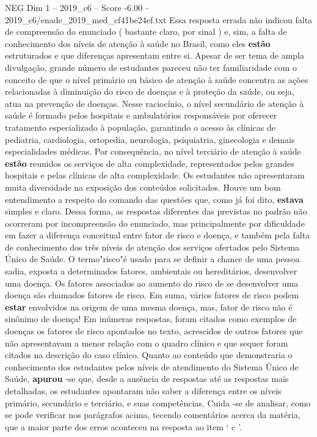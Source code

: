 \begin{textsample}{NEG Dim 1 – 2019\_c6 – Score -6.00 – 2019\_c6/enade\_2019\_med\_cf41be24ef.txt}
Essa resposta errada não indicou falta de compreensão do enunciado ( bastante claro, por sinal ) e, sim, a falta de conhecimento dos níveis de atenção à saúde no Brasil, como eles \textbf{estão} estruturados e que diferenças apresentam entre si.
Apesar de ser tema de ampla divulgação, grande número de estudantes pareceu não ter familiaridade com o conceito de que o nível primário ou básico de atenção à saúde concentra as ações relacionadas à diminuição do risco de doenças e à proteção da saúde, ou seja, atua na prevenção de doenças.
Nesse raciocínio, o nível secundário de atenção à saúde é formado pelos hospitais e ambulatórios responsáveis por oferecer tratamento especializado à população, garantindo o acesso às clínicas de pediatria, cardiologia, ortopedia, neurologia, psiquiatria, ginecologia e demais especialidades médicas.
Por consequência, no nível terciário de atenção à saúde \textbf{estão} reunidos os serviços de alta complexidade, representados pelos grandes hospitais e pelas clínicas de alta complexidade.
Os estudantes não apresentaram muita diversidade na exposição dos conteúdos solicitados.
Houve um bom entendimento a respeito do comando das questões que, como já foi dito, \textbf{estava} simples e claro.
Dessa forma, as respostas diferentes das previstas no padrão não ocorreram por incompreensão do enunciado, mas principalmente por dificuldade em fazer a diferença conceitual entre fator de risco e doença, e também pela falta de conhecimento dos três níveis de atenção dos serviços ofertados pelo Sistema Único de Saúde.
O termo"risco"é usado para se definir a chance de uma pessoa sadia, exposta a determinados fatores, ambientais ou hereditários, desenvolver uma doença.
Os fatores associados ao aumento do risco de se desenvolver uma doença são chamados fatores de risco.
Em suma, vários fatores de risco podem \textbf{estar} envolvidos na origem de uma mesma doença, mas, fator de risco não é sinônimo de doença!
Em inúmeras respostas, foram citados como exemplos de doenças os fatores de risco apontados no texto, acrescidos de outros fatores que não apresentavam a menor relação com o quadro clínico e que sequer foram citados na descrição do caso clínico.
Quanto ao conteúdo que demonstraria o conhecimento dos estudantes pelos níveis de atendimento do Sistema Único de Saúde, \textbf{apurou} -se que, desde a ausência de respostas até as respostas mais detalhadas, os estudantes apontaram não saber a diferença entre os níveis primário, secundário e terciário, e suas competências.
Cuida -se de analisar, como se pode verificar nos parágrafos acima, tecendo comentários acerca da matéria, que a maior parte dos erros aconteceu na resposta ao item ‘ c ’.

\end{textsample}
